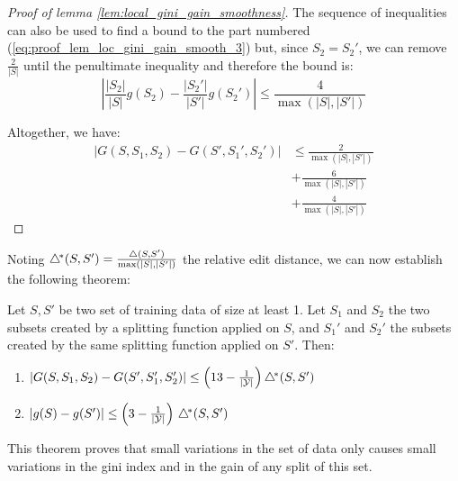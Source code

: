 \begin{proof}[Proof of lemma \ref{lem:local_gini_gain_smoothness}]
    The sequence of inequalities can also be used to find a bound to the part numbered (\ref{eq:proof_lem_loc_gini_gain_smooth_3}) but, since $S_2 = S_2'$, we can remove $\frac{2}{|S|}$ until the penultimate inequality and therefore the bound is:
    \begin{equation*}
        \left|\frac{|S_2|}{|S|}g(S_2) - \frac{|S_2'|}{|S'|}g(S_2')\right| \leq \frac{4}{\max(|S|, |S'|)}
    \end{equation*}

    Altogether, we have:
    \begin{equation*}
        \begin{split}
            |G(S, S_1, S_2) - G(S', S_1', S_2')| & \leq \frac{2}{\max(|S|, |S'|)}\\
            &+ \frac{6}{\max(|S|, |S'|)}\\
            &+ \frac{4}{\max(|S|, |S'|)}
        \end{split}
    \end{equation*}
\end{proof}

Noting $\triangle^{\!*}(S, S') = \frac{\triangle(S, S')}{\max(|S|, |S'|)}$ the relative edit distance, we can now establish the following theorem:

\begin{theorem}
\label{th:smoothness}
Let $S, S'$ be two set of training data of size at least 1. Let $S_1$ and $S_2$ the two subsets created by a splitting function applied on $S$, and $S_1'$ and $S_2'$ the subsets created by the same splitting function applied on $S'$. Then:
\begin{enumerate}
    \item $|G(S,S_1,S_2) - G(S',S_1',S_2')| \leq \left(13-\frac{1}{|\mathcal{Y}|}\right) \triangle^{\!*}(S,S')$
    \item $|g(S)-g(S')| \le \left(3 - \frac{1}{|\mathcal{Y}|}\right) \, \triangle^{\!*}(S,S')$
\end{enumerate}
\end{theorem}

This theorem proves that small variations in the set of data only causes small variations in the gini index and in the gain of any split of this set.


